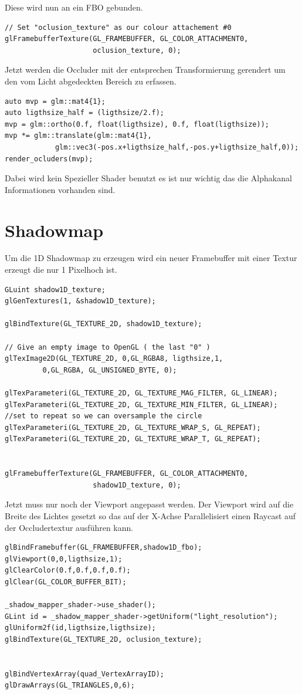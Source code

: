 Diese wird nun an ein FBO gebunden.
\begin{lstlisting}
// Set "oclusion_texture" as our colour attachement #0
glFramebufferTexture(GL_FRAMEBUFFER, GL_COLOR_ATTACHMENT0, 
					 oclusion_texture, 0);
\end{lstlisting}

Jetzt werden die Occluder mit der entsprechen Transformierung gerendert um den vom Licht abgedeckten Bereich zu erfassen.
\begin{lstlisting}
auto mvp = glm::mat4{1};
auto ligthsize_half = (ligthsize/2.f);
mvp = glm::ortho(0.f, float(ligthsize), 0.f, float(ligthsize));
mvp *= glm::translate(glm::mat4{1},
			glm::vec3(-pos.x+ligthsize_half,-pos.y+ligthsize_half,0));
render_ocluders(mvp);
\end{lstlisting}

Dabei wird kein Spezieller Shader benutzt es ist nur wichtig das die Alphakanal Informationen vorhanden sind.

\section{Shadowmap}
Um die 1D Shadowmap zu erzeugen wird ein neuer Framebuffer mit einer Textur erzeugt die nur 1 Pixelhoch ist.
\begin{lstlisting}
GLuint shadow1D_texture;
glGenTextures(1, &shadow1D_texture);

glBindTexture(GL_TEXTURE_2D, shadow1D_texture);

// Give an empty image to OpenGL ( the last "0" )
glTexImage2D(GL_TEXTURE_2D, 0,GL_RGBA8, ligthsize,1,
		 0,GL_RGBA, GL_UNSIGNED_BYTE, 0);

glTexParameteri(GL_TEXTURE_2D, GL_TEXTURE_MAG_FILTER, GL_LINEAR);
glTexParameteri(GL_TEXTURE_2D, GL_TEXTURE_MIN_FILTER, GL_LINEAR);
//set to repeat so we can oversample the circle
glTexParameteri(GL_TEXTURE_2D, GL_TEXTURE_WRAP_S, GL_REPEAT); 
glTexParameteri(GL_TEXTURE_2D, GL_TEXTURE_WRAP_T, GL_REPEAT);


glFramebufferTexture(GL_FRAMEBUFFER, GL_COLOR_ATTACHMENT0,
					 shadow1D_texture, 0);
\end{lstlisting}

Jetzt muss nur noch der Viewport angepasst werden. Der Viewport wird auf die Breite des Lichtes gesetzt so das auf der X-Achse Parallelisiert einen Raycast auf der Occludertextur ausführen kann.

\begin{lstlisting}
glBindFramebuffer(GL_FRAMEBUFFER,shadow1D_fbo);
glViewport(0,0,ligthsize,1);
glClearColor(0.f,0.f,0.f,0.f);
glClear(GL_COLOR_BUFFER_BIT);

_shadow_mapper_shader->use_shader();
GLint id = _shadow_mapper_shader->getUniform("light_resolution");
glUniform2f(id,ligthsize,ligthsize);
glBindTexture(GL_TEXTURE_2D, oclusion_texture);


glBindVertexArray(quad_VertexArrayID);
glDrawArrays(GL_TRIANGLES,0,6);
\end{lstlisting}

